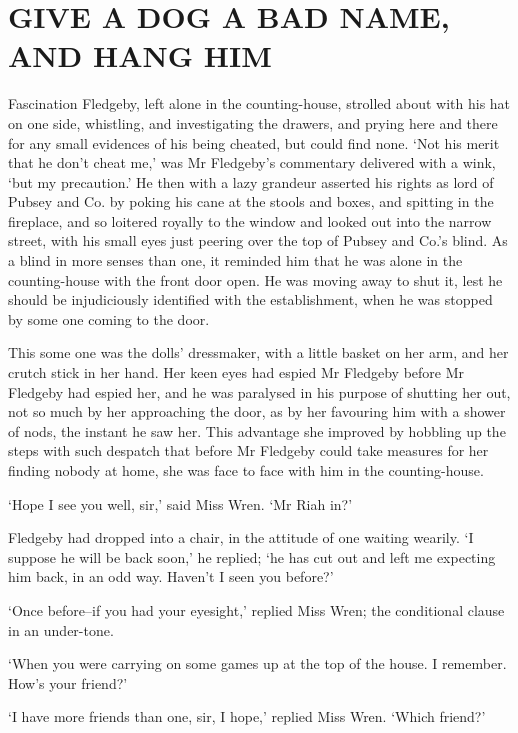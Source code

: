 
\chapter{GIVE A DOG A BAD NAME, AND HANG HIM}
Fascination Fledgeby, left alone in the counting-house, strolled about
with his hat on one side, whistling, and investigating the drawers, and
prying here and there for any small evidences of his being cheated,
but could find none. ‘Not his merit that he don’t cheat me,’ was Mr
Fledgeby’s commentary delivered with a wink, ‘but my precaution.’ He
then with a lazy grandeur asserted his rights as lord of Pubsey and
Co. by poking his cane at the stools and boxes, and spitting in the
fireplace, and so loitered royally to the window and looked out into the
narrow street, with his small eyes just peering over the top of Pubsey
and Co.’s blind. As a blind in more senses than one, it reminded him
that he was alone in the counting-house with the front door open. He was
moving away to shut it, lest he should be injudiciously identified with
the establishment, when he was stopped by some one coming to the door.

This some one was the dolls’ dressmaker, with a little basket on her
arm, and her crutch stick in her hand. Her keen eyes had espied Mr
Fledgeby before Mr Fledgeby had espied her, and he was paralysed in his
purpose of shutting her out, not so much by her approaching the door, as
by her favouring him with a shower of nods, the instant he saw her. This
advantage she improved by hobbling up the steps with such despatch that
before Mr Fledgeby could take measures for her finding nobody at home,
she was face to face with him in the counting-house.

‘Hope I see you well, sir,’ said Miss Wren. ‘Mr Riah in?’

Fledgeby had dropped into a chair, in the attitude of one waiting
wearily. ‘I suppose he will be back soon,’ he replied; ‘he has cut
out and left me expecting him back, in an odd way. Haven’t I seen you
before?’

‘Once before--if you had your eyesight,’ replied Miss Wren; the
conditional clause in an under-tone.

‘When you were carrying on some games up at the top of the house. I
remember. How’s your friend?’

‘I have more friends than one, sir, I hope,’ replied Miss Wren. ‘Which
friend?’

